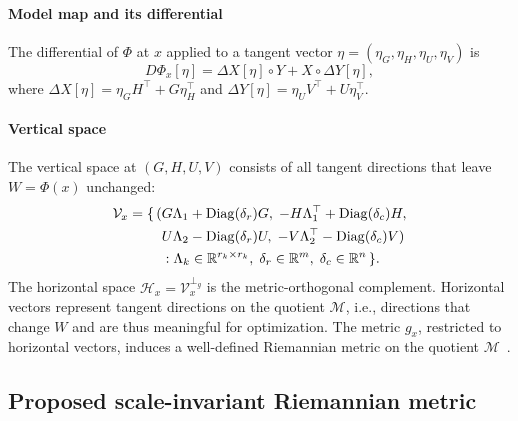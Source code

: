 \documentclass[letterpaper, 10 pt, conference]{ieeeconf}
\newcommand{\R}{\mathbb{R}}
\newcommand{\cM}{\mathcal{M}}
\newcommand{\cV}{\mathcal{V}}
\newcommand{\cH}{\mathcal{H}}
\newcommand{\diag}{\operatorname{Diag}}
\newcommand{\Had}{\circ}
\theoremstyle{plain}
\theoremstyle{definition}
\theoremstyle{remark}
\begin{document}
\paragraph{Model map and its differential}
The differential of $\Phi$ at $x$ applied to a tangent vector $\eta = (\eta_G,\eta_H,\eta_U,\eta_V)$ is
\begin{equation}
  D\Phi_x[\eta] = \Delta X[\eta]\Had Y + X\Had\Delta Y[\eta],
  \label{eq:dphi}
\end{equation}
where $\Delta X[\eta] = \eta_G H^\top + G\eta_H^\top$ and $\Delta Y[\eta] = \eta_U V^\top + U\eta_V^\top$.

\paragraph{Vertical space}
The vertical space at $(G,H,U,V)$ consists of all tangent directions that leave $W = \Phi(x)$ unchanged:
\begin{align}
  \cV_x = \{\,(&G\Lambda_1 + \diag(\delta_r)G,\; -H\Lambda_1^\top + \diag(\delta_c)H, \notag\\
               &U\Lambda_2 - \diag(\delta_r)U,\; -V\Lambda_2^\top - \diag(\delta_c)V) \notag\\
               &: \Lambda_k\in\R^{r_k\times r_k},\; \delta_r\in\R^m,\; \delta_c\in\R^n \,\}.
\end{align}
The horizontal space $\cH_x = \cV_x^{\perp_g}$ is the metric-orthogonal complement. Horizontal vectors represent tangent directions on the quotient $\cM$, i.e., directions that change $W$ and are thus meaningful for optimization. The metric $g_x$, restricted to horizontal vectors, induces a well-defined Riemannian metric on the quotient $\cM$~\cite{absilbook}.

\subsection{Proposed scale-invariant Riemannian metric}
\end{document}
